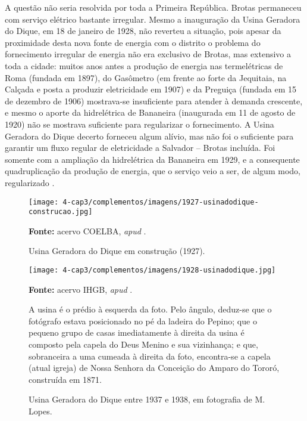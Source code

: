 A questão não seria resolvida por toda a Primeira República. Brotas permaneceu com serviço elétrico bastante irregular. Mesmo a inauguração da Usina Geradora do Dique, em 18 de janeiro de 1928, não reverteu a situação, pois apesar da proximidade desta nova fonte de energia com o distrito o problema do fornecimento irregular de energia não era exclusivo de Brotas, mas extensivo a toda a cidade: muitos anos antes a produção de energia nas termelétricas de Roma (fundada em 1897), do Gasômetro (em frente ao forte da Jequitaia, na Calçada e posta a produzir eletricidade em 1907) e da Preguiça (fundada em 15 de dezembro de 1906) mostrava-se insuficiente para atender à demanda crescente, e mesmo o aporte da hidrelétrica de Bananeira (inaugurada em 11 de agosto de 1920) não se mostrava suficiente para regularizar o fornecimento. A Usina Geradora do Dique decerto forneceu algum alívio, mas não foi o suficiente para garantir um fluxo regular de eletricidade a Salvador -- Brotas incluída. Foi somente com a ampliação da hidrelétrica da Bananeira em 1929, e a consequente quadruplicação da produção de energia, que o serviço veio a ser, de algum modo, regularizado \cite{reboucas_eletricidade_2018}.

\begin{figure}[!htp]
\centering
\caption{Usina Geradora do Dique em construção (1927).}
\texttt{[image: 4-cap3/complementos/imagens/1927-usinadodique-construcao.jpg]}{\par \footnotesize \textbf{Fonte:} acervo COELBA, \textit{apud} .}
\label{fig:usinadiqueconstrucao}
\end{figure}

\begin{figure}[!htp]
\centering
\caption{Usina Geradora do Dique entre 1937 e 1938, em fotografia de M. Lopes.}
\texttt{[image: 4-cap3/complementos/imagens/1928-usinadodique.jpg]}{\par \footnotesize \textbf{Fonte:} acervo IHGB, \textit{apud} . \par A usina é o prédio à esquerda da foto. Pelo ângulo, deduz-se que o fotógrafo estava posicionado no pé da ladeira do Pepino; que o pequeno grupo de casas imediatamente à direita da usina é composto pela capela do Deus Menino e sua vizinhança; e que, sobranceira a uma cumeada à direita da foto, encontra-se a capela (atual igreja) de Nossa Senhora da Conceição do Amparo do Tororó, construída em 1871.}
\label{fig:usinadique}
\end{figure}

